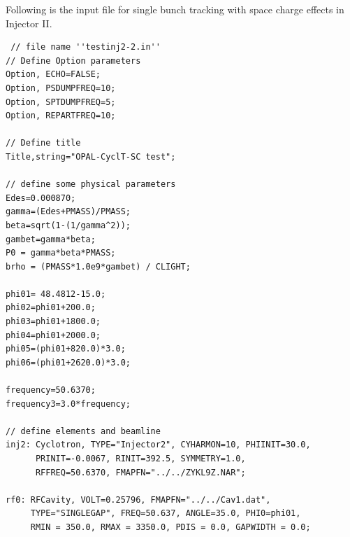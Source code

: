 Following is the input file for single bunch tracking with space charge effects in Injector II.
\begin{fmpage}
\begin{footnotesize}
\begin{verbatim}
 // file name ''testinj2-2.in''
// Define Option parameters 
Option, ECHO=FALSE;
Option, PSDUMPFREQ=10;
Option, SPTDUMPFREQ=5;
Option, REPARTFREQ=10;

// Define title
Title,string="OPAL-CyclT-SC test";

// define some physical parameters 
Edes=0.000870;
gamma=(Edes+PMASS)/PMASS;
beta=sqrt(1-(1/gamma^2));
gambet=gamma*beta;
P0 = gamma*beta*PMASS;
brho = (PMASS*1.0e9*gambet) / CLIGHT;

phi01= 48.4812-15.0;
phi02=phi01+200.0;
phi03=phi01+1800.0;
phi04=phi01+2000.0;
phi05=(phi01+820.0)*3.0;
phi06=(phi01+2620.0)*3.0;

frequency=50.6370;
frequency3=3.0*frequency;

// define elements and beamline
inj2: Cyclotron, TYPE="Injector2", CYHARMON=10, PHIINIT=30.0, 
      PRINIT=-0.0067, RINIT=392.5, SYMMETRY=1.0, 
      RFFREQ=50.6370, FMAPFN="../../ZYKL9Z.NAR";

rf0: RFCavity, VOLT=0.25796, FMAPFN="../../Cav1.dat", 
     TYPE="SINGLEGAP", FREQ=50.637, ANGLE=35.0, PHI0=phi01,
     RMIN = 350.0, RMAX = 3350.0, PDIS = 0.0, GAPWIDTH = 0.0;
\end{verbatim}
\end{footnotesize}
\end{fmpage}
